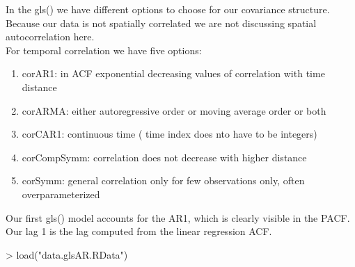 \documentclass[11pt, a4paper]{article} %
\begin{document}
In the gls() we have different options to choose for our covariance structure. Because our data is not spatially correlated we are not discussing spatial autocorrelation here.\\

For temporal correlation we have five options:
\begin{enumerate}
\item corAR1: in ACF exponential decreasing values of correlation with time distance\\
\item corARMA: either autoregressive order or moving average order or both\\
\item corCAR1: continuous time ( time index does nto have to be integers)\\
\item corCompSymm: correlation does not decrease with higher distance\\
\item corSymm: general correlation only for few observations only, often overparameterized\\
\end{enumerate}



Our first gls() model accounts for the AR1, which is clearly visible in the PACF. 
Our lag 1 is the lag computed from the linear regression ACF.

\begin{Schunk}
\end{Schunk}

\begin{Schunk}
\begin{Sinput}
> load("data.glsAR.RData")
\end{Sinput}
\end{Schunk}
\end{document}
